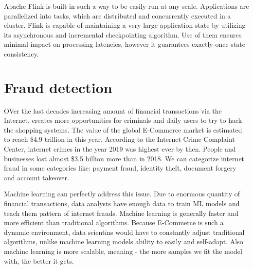 Apache Flink is built in such a way to be easily run at any scale. Applications are parallelized into tasks,
which are distributed and concurrently executed in a cluster.
Flink is capable of maintaining a very large application state by utilizing its asynchronous and incremental checkpointing algorithm.
Use of them ensures minimal impact on processing latencies, however it guarantees exactly-once state consistency.\cite{flink}

\section{Fraud detection}

OVer the last decades increasing amount of financial transactions via the Internet, creates more opportunities for
criminals and daily users to try to hack the shopping systems.
The value of the global E-Commerce market is estimated to reach \$4.9 trillion in this year.
According to the Internet Crime Complaint Center, internet crimes in the year 2019 was highest ever by then.
People and businesses lost almost \$3.5 billion more than in 2018. We can categorize internet fraud
in some categories like: payment fraud, identity theft, document forgery and account takeover.

Machine learning can perfectly address this issue. Due to enormous quantity of financial transactions,
data analysts  have enough data to train ML models and teach them pattern of internet frauds.
Machine learning is generally faster and more efficient than traditional algorithms.
Because E-Commerce is such a dynamic environment, data scientins would have to constantly adjust traditional
algorithms, unlike machine learning models ability to easily and self-adapt.
Also machine learning is more scalable, meaning - the more samples we fit the model with, the better it gets.\cite{frauds}
